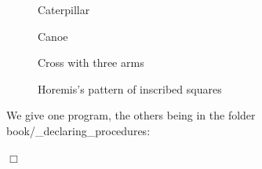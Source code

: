 \begin{figure}[!h]
%
\caption{Caterpillar}%
\end{figure}
\begin{figure}[!h]
%
\caption{Canoe}%
\end{figure}
\vfil
\begin{figure}[!h]
%
\caption{Cross with three arms}%
\label{fig:crx3b}%
\end{figure}
\onecolumn
\begin{figure}[h]
 \caption{Horemis's pattern of inscribed squares}\label{fig:carinspt}
\end{figure}
\begin{corrige}{
We give one program, the others being in the folder 
{\idt book/\_declaring\_procedures}:
\label{prog:HeliceEnCouleur}

\noindent $\Box$}\end{corrige}

\vfill

